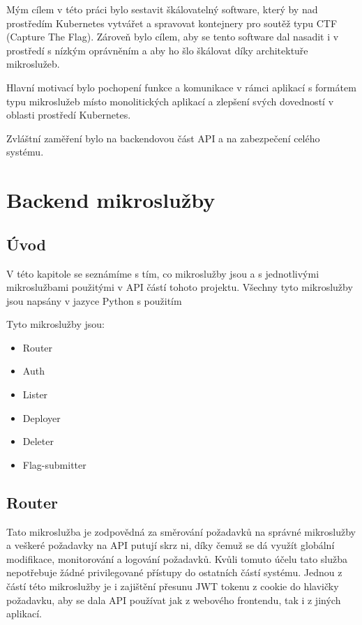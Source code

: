 \documentclass[12pt, a4paper,
twoside,        %
openright
]{report}
\begin{document}
Mým cílem v této práci bylo sestavit škálovatelný software, který by nad prostředím Kubernetes vytvářet a spravovat kontejnery pro soutěž typu CTF (Capture The Flag). Zároveň bylo cílem, aby se tento software dal nasadit i v prostředí s nízkým oprávněním a aby ho šlo škálovat díky architektuře mikroslužeb.

Hlavní motivací bylo pochopení funkce a komunikace v rámci aplikací s formátem typu mikroslužeb místo monolitických aplikací a zlepšení svých dovedností v oblasti prostředí Kubernetes.

Zvláštní zaměření bylo na backendovou část API a na zabezpečení celého systému.



\chapter{Backend mikroslužby}

\section{Úvod}
\label{sec:uvod}

V této kapitole se seznámíme s tím, co mikroslužby jsou a s jednotlivými mikroslužbami použitými v API částí tohoto projektu. Všechny tyto mikroslužby jsou napsány v jazyce Python s použitím 

Tyto mikroslužby jsou:
\begin{itemize}
	\item Router
	\item Auth
	\item Lister
	\item Deployer 
	\item Deleter
	\item Flag-submitter
\end{itemize}

\section{Router}
Tato mikroslužba je zodpovědná za směrování požadavků na správné mikroslužby a veškeré požadavky na API putují skrz ni, díky čemuž se dá využít globální modifikace, monitorování a logování požadavků. Kvůli tomuto účelu tato služba nepotřebuje žádné privilegované přístupy do ostatních částí systému. Jednou z částí této mikroslužby je i zajištění přesunu JWT tokenu z cookie do hlavičky požadavku, aby se dala API používat jak z webového frontendu, tak i z jiných aplikací.
\end{document}
